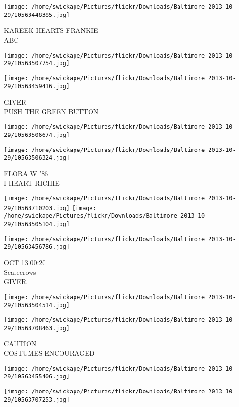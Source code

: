 \documentclass[10pt,letterpaper]{article}
\begin{document}
\vspace{0.25in}
\texttt{[image: /home/swickape/Pictures/flickr/Downloads/Baltimore 2013-10-29/10563448385.jpg]}

KAREEK HEARTS FRANKIE\\
ABC
\pagebreak

\texttt{[image: /home/swickape/Pictures/flickr/Downloads/Baltimore 2013-10-29/10563507754.jpg]}

\vspace{0.25in}
\texttt{[image: /home/swickape/Pictures/flickr/Downloads/Baltimore 2013-10-29/10563459416.jpg]}

GIVER\\
PUSH THE GREEN BUTTON
\pagebreak

\texttt{[image: /home/swickape/Pictures/flickr/Downloads/Baltimore 2013-10-29/10563506674.jpg]}

\vspace{0.25in}
\texttt{[image: /home/swickape/Pictures/flickr/Downloads/Baltimore 2013-10-29/10563506324.jpg]}

FLORA W '86\\
I HEART RICHIE
\pagebreak

\texttt{[image: /home/swickape/Pictures/flickr/Downloads/Baltimore 2013-10-29/10563710203.jpg]}
\texttt{[image: /home/swickape/Pictures/flickr/Downloads/Baltimore 2013-10-29/10563505104.jpg]}

\texttt{[image: /home/swickape/Pictures/flickr/Downloads/Baltimore 2013-10-29/10563456786.jpg]}

OCT 13 00:20\\
Scarecrows\\
GIVER
\pagebreak

\texttt{[image: /home/swickape/Pictures/flickr/Downloads/Baltimore 2013-10-29/10563504514.jpg]}

\vspace{0.25in}
\texttt{[image: /home/swickape/Pictures/flickr/Downloads/Baltimore 2013-10-29/10563708463.jpg]}

CAUTION\\
COSTUMES ENCOURAGED
\pagebreak

\texttt{[image: /home/swickape/Pictures/flickr/Downloads/Baltimore 2013-10-29/10563455406.jpg]}

\vspace{0.25in}
\texttt{[image: /home/swickape/Pictures/flickr/Downloads/Baltimore 2013-10-29/10563707253.jpg]}
\end{document}
